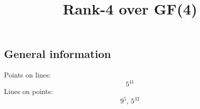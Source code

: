 \documentclass{article}
\newcommand\setTBstruts{\def\T{\rule{0pt}{2.6ex}}%
\def\B{\rule[-1.2ex]{0pt}{0pt}}}
\begin{document}
 
\setTBstruts



{\allowdisplaybreaks%






\title{Rank-4 over GF(4)}
\author{}%
\maketitle%
%
{}



\subsection*{General information}
Points on lines:
$$
5^{41}$$
Lines on points:
$$
9^5,\,5^{32}$$
}
\end{document}
